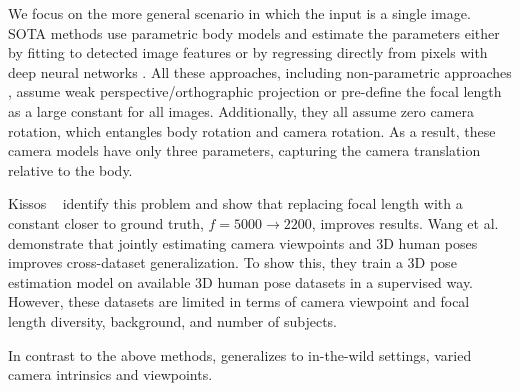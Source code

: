 \documentclass[10pt,twocolumn,letterpaper,usenames,dvipsnames]{article}
\begin{document}
We focus on the more general scenario in which the input is a single image. 
SOTA methods use parametric body models \cite{totalcapture,looper_smpl,SMPL-X:2019,xu2020ghum} 
and estimate the parameters either by fitting to detected image features \cite{bogo_smplify,SMPL-X:2019,xiang2019monocular} or by regressing directly from pixels with deep neural networks \cite{expose2020eccv,guler_2019_CVPR,jiang2020mpshape,joo2020eft,kanazawa_hmr,SPIN:ICCV:2019,Rockwell2020,rong2020frankmocap,song2020human,xu2019denserac,CenterHMR,zanfir2020weakly}.
All these approaches, including non-parametric approaches \cite{kolotouros2019cmr, saito2019pifu, saito2020pifuhd, Zeng_2020_CVPR}, assume weak perspective/orthographic projection or  pre-define the focal length as a large constant for all images. 
Additionally, they all assume zero camera rotation, which entangles body rotation and camera rotation.
As a result, these camera models have only three parameters, capturing the camera translation relative to the body.

Kissos \etal~\cite{kissosECCVW2020} identify this problem and show that replacing focal length with a constant closer to ground truth, \ie $f=5000 \rightarrow 2200$, improves results.
Wang et al.~\cite{wang2020viewpoint} demonstrate that jointly estimating camera viewpoints and 3D human poses improves cross-dataset generalization. 
To show this, they train a 3D pose estimation model on available 3D human pose datasets in a supervised way. 
However, these datasets are limited in terms of camera viewpoint and focal length diversity, background, and number of subjects.

In contrast to the above methods, \methodname generalizes to in-the-wild settings, varied camera intrinsics and viewpoints.
\end{document}
